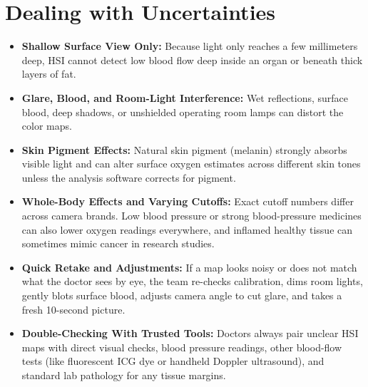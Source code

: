 \section{Dealing with Uncertainties}
\begin{itemize}
    \item \textbf{Shallow Surface View Only:} Because light only reaches a few millimeters deep, HSI cannot detect low blood flow deep inside an organ or beneath thick layers of fat.
    \item \textbf{Glare, Blood, and Room-Light Interference:} Wet reflections, surface blood, deep shadows, or unshielded operating room lamps can distort the color maps.
    \item \textbf{Skin Pigment Effects:} Natural skin pigment (melanin) strongly absorbs visible light and can alter surface oxygen estimates across different skin tones unless the analysis software corrects for pigment.
    \item \textbf{Whole-Body Effects and Varying Cutoffs:} Exact cutoff numbers differ across camera brands. Low blood pressure or strong blood-pressure medicines can also lower oxygen readings everywhere, and inflamed healthy tissue can sometimes mimic cancer in research studies.
    \item \textbf{Quick Retake and Adjustments:} If a map looks noisy or does not match what the doctor sees by eye, the team re-checks calibration, dims room lights, gently blots surface blood, adjusts camera angle to cut glare, and takes a fresh 10-second picture.
    \item \textbf{Double-Checking With Trusted Tools:} Doctors always pair unclear HSI maps with direct visual checks, blood pressure readings, other blood-flow tests (like fluorescent ICG dye or handheld Doppler ultrasound), and standard lab pathology for any tissue margins.
\end{itemize}

